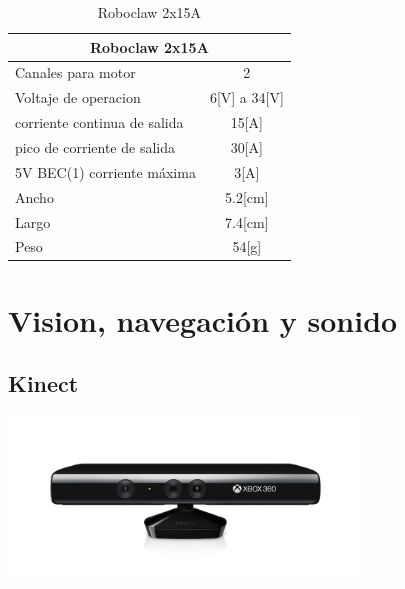 \documentclass[user_manual.tex]{subfiles}
\begin{document}
\begin{table}[H]
\begin{center}
\begin{tabular}{|l|l|}%


\hline
\multicolumn{2}{|c|}{Roboclaw 2x15A} \\ \hline %
Canales para motor & \multicolumn{1}{|c|}{2}\\ \hline
Voltaje de operacion & \multicolumn{1}{|c|}{6[V] a 34[V]}\\ \hline
corriente continua de salida & \multicolumn{1}{|c|}{15[A]}\\ \hline
pico de corriente de salida & \multicolumn{1}{|c|}{30[A]}\\ \hline
5V BEC(1) corriente máxima & \multicolumn{1}{|c|}{3[A]}\\ \hline
Ancho & \multicolumn{1}{|c|}{5.2[cm]}\\ \hline
Largo & \multicolumn{1}{|c|}{7.4[cm]}\\ \hline
Peso & \multicolumn{1}{|c|}{54[g]}\\ \hline

\end{tabular}
\caption{Roboclaw 2x15A}
\label{Datos del Roboclaw}
\end{center}
\end{table}


\vfill

\section{Vision, navegación y sonido}
\subsection{Kinect}

\begin{center}
\includegraphics[width=0.7\textwidth]{Figures/Hardware/Partes/Kinect.png}
\label{fig:Hardware:Partes:Kinect}
\end{center}
\end{document}
